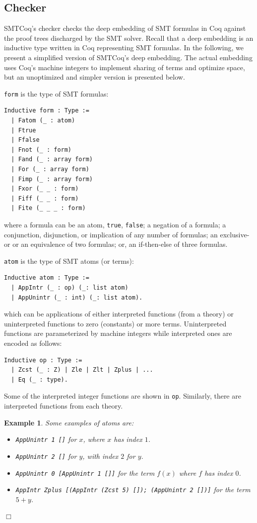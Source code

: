 \documentclass[11pt]{article}
\newtheorem{example}{Example}[section]
\begin{document}
	\subsection{Checker}
	\label{sec:checker}
	SMTCoq's checker checks the deep embedding
	of SMT formulas in Coq against the 
	proof trees discharged by the SMT solver.
	Recall that a deep embedding is an
	inductive type written in 
	Coq representing SMT formulas. 
	In the following, we present 
	a simplified version of SMTCoq's 
	deep embedding. The actual embedding 
	uses Coq's machine integers to 
	implement sharing of terms and 
	optimize space, but an unoptimized 
	and simpler version is presented 
	below. 
	
	\medskip
	
	\noindent \texttt{form} is the type of 
	SMT formulas:
	\begin{verbatim}
Inductive form : Type :=
  | Fatom (_ : atom)
  | Ftrue
  | Ffalse
  | Fnot (_ : form)
  | Fand (_ : array form)
  | For (_ : array form)
  | Fimp (_ : array form)
  | Fxor (_ _ : form)
  | Fiff (_ _ : form)
  | Fite (_ _ _ : form)
	\end{verbatim}
	where a formula can be an atom, 
	\texttt{true}, \texttt{false};
	a negation of a formula; a 
	conjunction, disjunction, or 
	implication of any number of
	formulas; an exclusive-or or
	an equivalence of two formulas; 
	or, an if-then-else of three formulas.
	
	\medskip
	
	\noindent \texttt{atom} is the type of SMT atoms
	(or terms):
	\begin{verbatim}
Inductive atom : Type :=
  | AppIntr (_ : op) (_: list atom)
  | AppUnintr (_ : int) (_: list atom).	
	\end{verbatim} 
	which can be applications of 
	either interpreted functions 
	(from a theory) or uninterpreted
	functions to zero (constants) or more 
	terms. Uninterpreted functions 
	are parameterized by machine 
	integers while interpreted ones 
	are encoded as follows:
	\begin{verbatim}
Inductive op : Type :=
  | Zcst (_ : Z) | Zle | Zlt | Zplus | ...
  | Eq (_ : type).
	\end{verbatim}
	Some of the interpreted integer 
	functions are shown in \texttt{op}.
	Similarly, there are interpreted 
	functions from each theory.
	
	\begin{example}
		\label{ex:deepatoms}
		\em Some examples of atoms are:
		\begin{itemize}
			\item \texttt{AppUnintr	1 []} for $x$,
			where $x$ has index $1$.
			\item \texttt{AppUnintr 2 []} for $y$,
			with index $2$ for $y$.
			\item \texttt{AppUnintr 0 [AppUnintr 
				1 []]} for the term $f(x)$ where 
			$f$ has index $0$.
			\item \texttt{AppIntr Zplus [(AppIntr 
				(Zcst 5) []); (AppUnintr 2 [])]} 
			for the term $5 + y$.
		\end{itemize} \hfill $\Box$
	\end{example}
	
\end{document}
